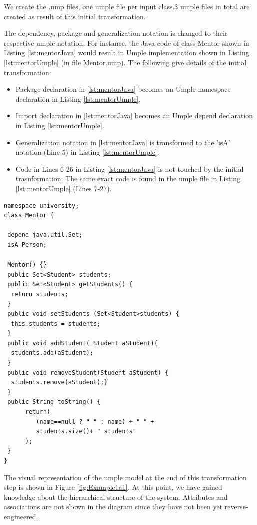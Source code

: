 We create the .ump files, one umple file per input class.3 umple files in total are created as result of this initial transformation.

The dependency, package and generalization notation is changed to their respective umple notation. For instance, the Java code of class Mentor shown in Listing \ref{lst:mentorJava} would result in  Umple implementation shown in Listing  \ref{lst:mentorUmple} (in file Mentor.ump). The following give details of the initial transformation:

\begin{itemize}
\item Package declaration in \ref{lst:mentorJava} becomes an Umple namespace declaration in Listing \ref{lst:mentorUmple}.
\item Import declaration in \ref{lst:mentorJava} becomes an Umple depend declaration in Listing \ref{lst:mentorUmple}.
\item Generalization notation in \ref{lst:mentorJava} is transformed to the 'isA' notation (Line 5) in Listing \ref{lst:mentorUmple}.
\item Code in Lines 6-26 in Listing \ref{lst:mentorJava} is not touched by the initial trasnformation; The same exact code is found in the umple file in Listing \ref{lst:mentorUmple} (Lines 7-27).
\end{itemize}

\begin{lstlisting}[style=umpleIn,caption=Mentor.ump,label=lst:mentorUmple]
namespace university;
class Mentor { 

 depend java.util.Set;
 isA Person;
 
 Mentor() {}
 public Set<Student> students;
 public Set<Student> getStudents() {
  return students; 
 } 
 public void setStudents (Set<Student>students) { 
  this.students = students;
 } 
 public void addStudent( Student aStudent){
  students.add(aStudent); 
 }
 public void removeStudent(Student aStudent) {
  students.remove(aStudent);} 
 } 
 public String toString() {
      return(
         (name==null ? " " : name) + " " +
         students.size()+ " students"
      );
 }
}
\end{lstlisting}

The visual representation of the umple model at the end of this transformation step is shown in Figure \ref{fig:Example1a1}. At this point, we have gained knowledge about the hierarchical structure of the system. Attributes and associations are not shown in the diagram since they have not been yet reverse-engineered.

